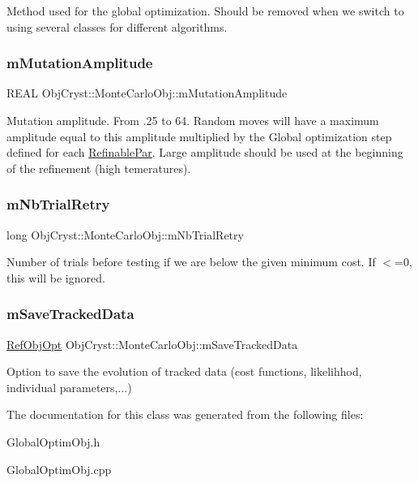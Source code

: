 Method used for the global optimization. Should be removed when we switch to using several classes for different algorithms. \mbox{\label{class_obj_cryst_1_1_monte_carlo_obj_afb02263e40ec89621bffe34ca859be96}} 
\subsubsection{\texorpdfstring{mMutationAmplitude}{mMutationAmplitude}}
{\footnotesize\ttfamily R\+E\+AL Obj\+Cryst\+::\+Monte\+Carlo\+Obj\+::m\+Mutation\+Amplitude\hspace{0.3cm}{\ttfamily [protected]}}

Mutation amplitude. From .25 to 64. Random moves will have a maximum amplitude equal to this amplitude multiplied by the Global optimization step defined for each \mbox{\hyperlink{class_obj_cryst_1_1_refinable_par}{Refinable\+Par}}. Large amplitude should be used at the beginning of the refinement (high temeratures). \mbox{\label{class_obj_cryst_1_1_monte_carlo_obj_a22e972f1cb525f9dc5336fd1f47fa93b}} 
\subsubsection{\texorpdfstring{mNbTrialRetry}{mNbTrialRetry}}
{\footnotesize\ttfamily long Obj\+Cryst\+::\+Monte\+Carlo\+Obj\+::m\+Nb\+Trial\+Retry\hspace{0.3cm}{\ttfamily [protected]}}

Number of trials before testing if we are below the given minimum cost. If $<$=0, this will be ignored. \mbox{\label{class_obj_cryst_1_1_monte_carlo_obj_ac782f38b1343464aa3db886873798107}} 
\subsubsection{\texorpdfstring{mSaveTrackedData}{mSaveTrackedData}}
{\footnotesize\ttfamily \mbox{\hyperlink{class_obj_cryst_1_1_ref_obj_opt}{Ref\+Obj\+Opt}} Obj\+Cryst\+::\+Monte\+Carlo\+Obj\+::m\+Save\+Tracked\+Data\hspace{0.3cm}{\ttfamily [protected]}}

Option to save the evolution of tracked data (cost functions, likelihhod, individual parameters,...) 

The documentation for this class was generated from the following files\+:\begin{DoxyCompactItemize}
\item 
Global\+Optim\+Obj.\+h\item 
Global\+Optim\+Obj.\+cpp\end{DoxyCompactItemize}
